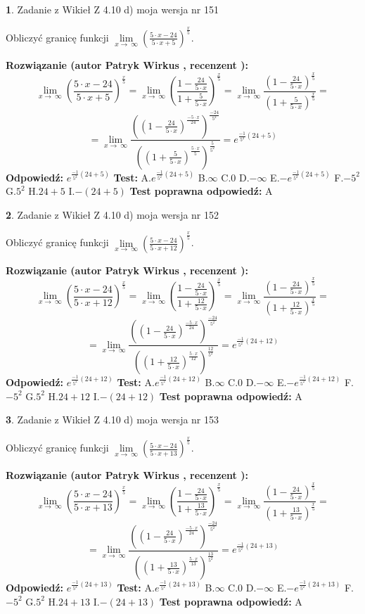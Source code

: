 \documentclass[12pt, a4paper]{article}
\theoremstyle{definition} %
\newtheorem{zad}{}
\newcommand{\zadStart}[1]{\begin{zad}#1\newline}
\newcommand{\zadStop}{\end{zad}}
\newcommand{\rozwStart}[2]{\noindent \textbf{Rozwiązanie (autor #1 , recenzent #2): }\newline}
\newcommand{\rozwStop}{\newline}
\newcommand{\odpStart}{\noindent \textbf{Odpowiedź:}\newline}
\newcommand{\odpStop}{\newline}
\newcommand{\testStart}{\noindent \textbf{Test:}\newline}
\newcommand{\testStop}{\newline}
\newcommand{\kluczStart}{\noindent \textbf{Test poprawna odpowiedź:}\newline}
\newcommand{\kluczStop}{\newline}
\begin{document}
\zadStart{Zadanie z Wikieł Z 4.10 d) moja wersja nr 151}


Obliczyć granicę funkcji  $\lim\limits_{x\to\ \infty}(\frac{5\cdot x-24}{5\cdot x+5})^{\frac{x}{5}}$.
\zadStop
\rozwStart{Patryk Wirkus}{}
$$\lim\limits_{x\to\ \infty}(\frac{5\cdot x-24}{5\cdot x+5})^{\frac{x}{5}} = \lim\limits_{x\to\ \infty}(\frac{1-\frac{24}{5\cdot x}}{1+\frac{5}{5\cdot x}})^{\frac{x}{5}}=\lim\limits_{x\to\ \infty}\frac{(1-\frac{24}{5\cdot x})^{\frac{x}{5}}}{(1+\frac{5}{5\cdot x})^{\frac{x}{5}}}=$$
$$=\lim\limits_{x\to\ \infty}\frac{((1-\frac{24}{5\cdot x})^{\frac{-5\cdot x}{24}})^{\frac{-24}{5^{2}}}}{((1+\frac{5}{5\cdot x})^{\frac{5\cdot x}{5}})^{\frac{5}{5^{2}}}}=e^{\frac{-1}{5^{2}}(24+5)}$$
\rozwStop
\odpStart
$e^{\frac{-1}{5^{2}}(24+5)}$
\odpStop
\testStart
A.$e^{\frac{-1}{5^{2}}(24+5)}$ B.$\infty$ C.$0$ D.$-\infty$ E.$-e^{\frac{-1}{5^{2}}(24+5)}$
F.$-5^{2}$ G.$5^{2}$
H.$24+5$
I.$-(24+5)$
\testStop
\kluczStart
A
\kluczStop



\zadStart{Zadanie z Wikieł Z 4.10 d) moja wersja nr 152}


Obliczyć granicę funkcji  $\lim\limits_{x\to\ \infty}(\frac{5\cdot x-24}{5\cdot x+12})^{\frac{x}{5}}$.
\zadStop
\rozwStart{Patryk Wirkus}{}
$$\lim\limits_{x\to\ \infty}(\frac{5\cdot x-24}{5\cdot x+12})^{\frac{x}{5}} = \lim\limits_{x\to\ \infty}(\frac{1-\frac{24}{5\cdot x}}{1+\frac{12}{5\cdot x}})^{\frac{x}{5}}=\lim\limits_{x\to\ \infty}\frac{(1-\frac{24}{5\cdot x})^{\frac{x}{5}}}{(1+\frac{12}{5\cdot x})^{\frac{x}{5}}}=$$
$$=\lim\limits_{x\to\ \infty}\frac{((1-\frac{24}{5\cdot x})^{\frac{-5\cdot x}{24}})^{\frac{-24}{5^{2}}}}{((1+\frac{12}{5\cdot x})^{\frac{5\cdot x}{12}})^{\frac{12}{5^{2}}}}=e^{\frac{-1}{5^{2}}(24+12)}$$
\rozwStop
\odpStart
$e^{\frac{-1}{5^{2}}(24+12)}$
\odpStop
\testStart
A.$e^{\frac{-1}{5^{2}}(24+12)}$ B.$\infty$ C.$0$ D.$-\infty$ E.$-e^{\frac{-1}{5^{2}}(24+12)}$
F.$-5^{2}$ G.$5^{2}$
H.$24+12$
I.$-(24+12)$
\testStop
\kluczStart
A
\kluczStop



\zadStart{Zadanie z Wikieł Z 4.10 d) moja wersja nr 153}


Obliczyć granicę funkcji  $\lim\limits_{x\to\ \infty}(\frac{5\cdot x-24}{5\cdot x+13})^{\frac{x}{5}}$.
\zadStop
\rozwStart{Patryk Wirkus}{}
$$\lim\limits_{x\to\ \infty}(\frac{5\cdot x-24}{5\cdot x+13})^{\frac{x}{5}} = \lim\limits_{x\to\ \infty}(\frac{1-\frac{24}{5\cdot x}}{1+\frac{13}{5\cdot x}})^{\frac{x}{5}}=\lim\limits_{x\to\ \infty}\frac{(1-\frac{24}{5\cdot x})^{\frac{x}{5}}}{(1+\frac{13}{5\cdot x})^{\frac{x}{5}}}=$$
$$=\lim\limits_{x\to\ \infty}\frac{((1-\frac{24}{5\cdot x})^{\frac{-5\cdot x}{24}})^{\frac{-24}{5^{2}}}}{((1+\frac{13}{5\cdot x})^{\frac{5\cdot x}{13}})^{\frac{13}{5^{2}}}}=e^{\frac{-1}{5^{2}}(24+13)}$$
\rozwStop
\odpStart
$e^{\frac{-1}{5^{2}}(24+13)}$
\odpStop
\testStart
A.$e^{\frac{-1}{5^{2}}(24+13)}$ B.$\infty$ C.$0$ D.$-\infty$ E.$-e^{\frac{-1}{5^{2}}(24+13)}$
F.$-5^{2}$ G.$5^{2}$
H.$24+13$
I.$-(24+13)$
\testStop
\kluczStart
A
\kluczStop
\end{document}
